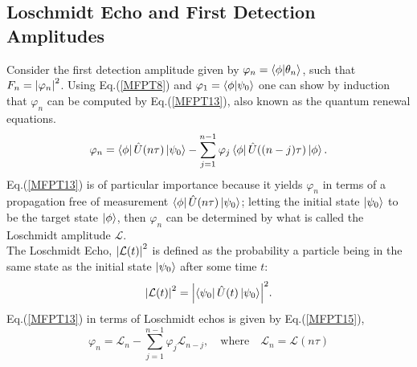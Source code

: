 \documentclass{article}
\numberwithin{equation}{section}
\newcommand{\1}{\mathbb{1}}
\newcommand{\state}{\ket{\phi}}
\newcommand{\projection}{\bra{\phi}}
\begin{document}
\subsection{Loschmidt Echo and First Detection Amplitudes}
Consider the first detection amplitude given by $\varphi_n=\projection\ket{\theta_n}$, such that $F_n=\abs{\varphi_n}^2$. Using Eq.(\ref{MFPT8}) and $\varphi_1=\projection\ket{\psi_0}$ one can show by induction that $\varphi_n$ can be computed by Eq.(\ref{MFPT13}), also known as the quantum renewal equations\cite{barkai}.
\begin{equation}\label{MFPT13}
    \varphi_n=\projection\hat{U}(n\tau)\ket{\psi_0}-\sum_{j=1}^{n-1}\varphi_j\projection\hat{U}((n-j)\tau)\state.   
\end{equation}
Eq.(\ref{MFPT13}) is of particular importance because it yields $\varphi_n$ in terms of a propagation free of measurement $\projection\hat{U}(n\tau)\ket{\psi_0}$; letting the initial state $\ket{\psi_0}$ to be the target state $\state$, then $\varphi_n$ can be determined by what is called the Loschmidt amplitude $\mathcal{L}$.
\\
The Loschmidt Echo, $\abs{\mathcal{L}(t)}^2$ is defined as the probability a particle being in the same state as the initial state $\ket{\psi_0}$ after some time $t$:
\begin{equation}\label{MFPT14}
    \abs{\mathcal{L}(t)}^2=\abs{\bra{\psi_0}\hat{U}(t)\ket{\psi_0}}^2.
\end{equation}
Eq.(\ref{MFPT13}) in terms of Loschmidt echos is given by Eq.(\ref{MFPT15}),
\begin{equation}\label{MFPT15}
    \varphi_n=\mathcal{L}_n-\sum_{j=1}^{n-1}\varphi_j\mathcal{L}_{n-j}, \quad \text{where} \quad \mathcal{L}_n=\mathcal{L}(n\tau)
\end{equation}
\end{document}
